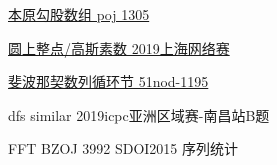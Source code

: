 

\vbox{}

\vbox{}

\begin{problemset}
	\item \href{http://poj.org/problem?id=1305}{本原勾股数组 \quad poj 1305}
	\item \href{https://nanti.jisuanke.com/t/41421}{圆上整点/高斯素数 \quad 2019上海网络赛}
	\item \href{https://www.51nod.com/Challenge/Problem.html#problemId=1195}{斐波那契数列循环节 \quad 51nod-1195}
	\item dfs similar \quad 2019icpc亚洲区域赛-南昌站B题
	\item FFT \quad BZOJ 3992 SDOI2015 序列统计
\end{problemset}


\nocite{*} 

